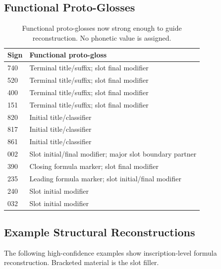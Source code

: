 \subsection{Functional Proto-Glosses}

\begin{table}[htbp]
\centering
\begin{tabular}{lp{}}
\toprule
\textbf{Sign} & \textbf{Functional proto-gloss} \\
\midrule
740 & Terminal title/suffix; slot final modifier \\
520 & Terminal title/suffix; slot final modifier \\
400 & Terminal title/suffix; slot final modifier \\
151 & Terminal title/suffix; slot final modifier \\
820 & Initial title/classifier \\
817 & Initial title/classifier \\
861 & Initial title/classifier \\
002 & Slot initial/final modifier; major slot boundary partner \\
390 & Closing formula marker; slot final modifier \\
235 & Leading formula marker; slot initial/final modifier \\
240 & Slot initial modifier \\
032 & Slot initial modifier \\
\bottomrule
\end{tabular}
\caption{Functional proto-glosses now strong enough to guide reconstruction. No phonetic value is assigned.}
\label{tab:functional-proto-glosses}
\end{table}

\subsection{Example Structural Reconstructions}

The following high-confidence examples show inscription-level formula reconstruction.
Bracketed material is the slot filler.

